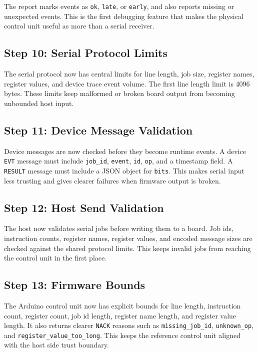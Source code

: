 \documentclass[11pt,a4paper]{article}
\begin{document}
The report marks events as \texttt{ok}, \texttt{late}, or \texttt{early}, and also reports missing or unexpected events. This is the first debugging feature that makes the physical control unit useful as more than a serial receiver.

\subsection{Step 10: Serial Protocol Limits}

The serial protocol now has central limits for line length, job size, register names, register values, and device trace event volume. The first line length limit is 4096 bytes. These limits keep malformed or broken board output from becoming unbounded host input.

\subsection{Step 11: Device Message Validation}

Device messages are now checked before they become runtime events. A device \texttt{EVT} message must include \texttt{job\_id}, \texttt{event}, \texttt{id}, \texttt{op}, and a timestamp field. A \texttt{RESULT} message must include a JSON object for \texttt{bits}. This makes serial input less trusting and gives clearer failures when firmware output is broken.

\subsection{Step 12: Host Send Validation}

The host now validates serial jobs before writing them to a board. Job ids, instruction counts, register names, register values, and encoded message sizes are checked against the shared protocol limits. This keeps invalid jobs from reaching the control unit in the first place.

\subsection{Step 13: Firmware Bounds}

The Arduino control unit now has explicit bounds for line length, instruction count, register count, job id length, register name length, and register value length. It also returns clearer \texttt{NACK} reasons such as \texttt{missing\_job\_id}, \texttt{unknown\_op}, and \texttt{register\_value\_too\_long}. This keeps the reference control unit aligned with the host side trust boundary.
\end{document}
